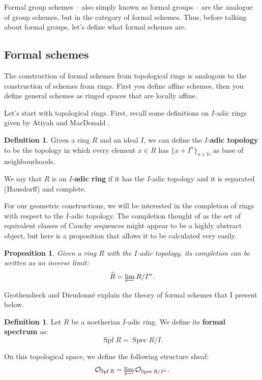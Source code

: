 \documentclass{report}
\DeclareMathOperator{\Spf}{Spf}
\DeclareMathOperator{\Spec}{Spec}
\newtheorem{proposition}[equation]{Proposition}
\theoremstyle{definition}
\newtheorem{definition}[equation]{Definition}
\begin{document}
Formal group schemes -- also simply known as formal groups -- are the analogue of group schemes, but in the category of formal schemes. Thus, before talking about formal groups, let's define what formal schemes are.

\subsection{Formal schemes}

The construction of formal schemes from topological rings is analogous to the construction of schemes from rings. First you define affine schemes, then you define general schemes as ringed spaces that are locally affine.

Let's start with topological rings. First, recall some definitions on $I$-adic rings given by Atiyah and MacDonald \cite[Chapter~10]{atiyah1969introduction}.

\begin{definition}
Given a ring $R$ and an ideal $I$, we can define the $I$-\textbf{adic topology} to be the topology in which every element $x\in R$ has $\{x+I^n\}_{n\in\mathbb{N}}$ as base of neighbourhoods.

We say that $R$ is an $I$-\textbf{adic ring} if it has the $I$-adic topology and it is separated (Hausdorff) and complete.
\end{definition}

For our geometric constructions, we will be interested in the completion of rings with respect to the $I$-adic topology. The completion thought of as the set of equivalent classes of Cauchy sequences might appear to be a highly abstract object, but here is a proposition that allows it to be calculated very easily.

\begin{proposition}
Given a ring $R$ with the $I$-adic topology, its completion can be written as an inverse limit:
\[\widehat{R}=\varprojlim R/I^n.\]
\end{proposition}

Grothendieck and Dieudonn\'{e} \cite[Section~I.10]{grothendieck1960elements} explain the theory of formal schemes that I present below.

\begin{definition}
Let $R$ be a noetherian $I$-adic ring. We define its \textbf{formal spectrum} as:
\[\Spf R=\Spec R/I.\]

On this topological space, we define the following structure sheaf:
\[\mathcal{O}_{\Spf R}=\varprojlim\mathcal{O}_{\Spec R/I^n}.\]
\end{definition}
\end{document}
